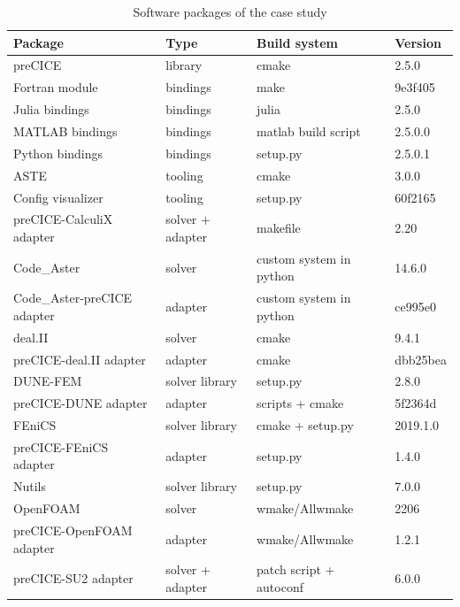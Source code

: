 \documentclass{eceasst}
\begin{document}
\begin{table}[!t]
  \normalsize
  \caption{Software packages of the case study}
  \label{table:label-distribution}
  \centering
  \begin{tabular}{|l|l|l|l|}
    \hline
    \bfseries Package & \bfseries Type & \bfseries Build system & \bfseries Version \\ \hline
    preCICE & library & cmake & 2.5.0 \\ \hline
    Fortran module & bindings & make & 9e3f405 \\ \hline
    Julia bindings & bindings & julia & 2.5.0 \\ \hline
    MATLAB bindings & bindings & matlab build script & 2.5.0.0 \\ \hline
    Python bindings & bindings & setup.py & 2.5.0.1 \\ \hline
    ASTE & tooling & cmake & 3.0.0 \\ \hline
    Config visualizer & tooling & setup.py & 60f2165 \\ \hline
    preCICE-CalculiX adapter & solver + adapter & makefile & 2.20 \\ \hline
    Code\_Aster & solver & custom system in python & 14.6.0 \\ \hline
    Code\_Aster-preCICE adapter & adapter & custom system in python & ce995e0 \\ \hline
    deal.II & solver & cmake & 9.4.1 \\ \hline
    preCICE-deal.II adapter & adapter & cmake & dbb25bea \\ \hline
    DUNE-FEM & solver library & setup.py & 2.8.0 \\ \hline
    preCICE-DUNE adapter& adapter & scripts + cmake & 5f2364d \\ \hline
    FEniCS & solver library& cmake + setup.py & 2019.1.0 \\ \hline
    preCICE-FEniCS adapter & adapter & setup.py & 1.4.0 \\ \hline
    Nutils & solver library & setup.py & 7.0.0 \\ \hline
    OpenFOAM & solver & wmake/Allwmake & 2206 \\ \hline
    preCICE-OpenFOAM adapter & adapter & wmake/Allwmake & 1.2.1 \\ \hline
    preCICE-SU2 adapter & solver + adapter & patch script + autoconf & 6.0.0 \\ \hline
  \end{tabular}
\end{table}
\end{document}
